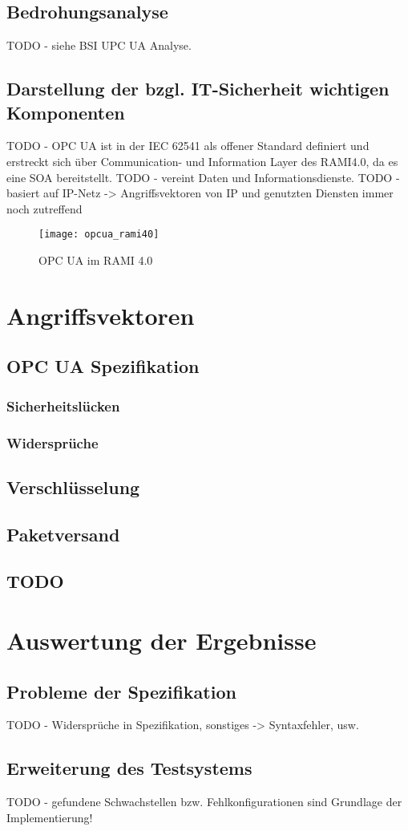 \subsection{Bedrohungsanalyse}
TODO - siehe BSI UPC UA Analyse.

\subsection{Darstellung der bzgl. IT-Sicherheit wichtigen Komponenten}


TODO - \ac{OPC UA} ist in der \ac{IEC} 62541 als offener Standard definiert und erstreckt sich über Communication- und Information Layer des \ac{RAMI4.0}, da es eine \ac{SOA} bereitstellt. 
TODO - vereint Daten und Informationsdienste. 
TODO - basiert auf IP-Netz -> Angriffsvektoren von IP und genutzten Diensten immer noch zutreffend

\begin{figure}[h]
    \centering
    \texttt{[image: opcua\_rami40]}
    \caption{OPC UA im RAMI 4.0}
    \label{Kap3:OPC UA im RAMI 4.0}
  \end{figure}
  
\clearpage

\section{Angriffsvektoren}
\subsection{\ac{OPC UA} Spezifikation}
\subsubsection{Sicherheitslücken}
\subsubsection{Widersprüche}
\subsubsection{}

\subsection{Verschlüsselung}
\subsection{Paketversand}
\subsection{TODO}

\section{Auswertung der Ergebnisse}
\subsection{Probleme der Spezifikation}
TODO - Widersprüche in Spezifikation, sonstiges -> Syntaxfehler, usw.

\subsection{Erweiterung des Testsystems}
TODO - gefundene Schwachstellen bzw. Fehlkonfigurationen sind Grundlage der Implementierung!